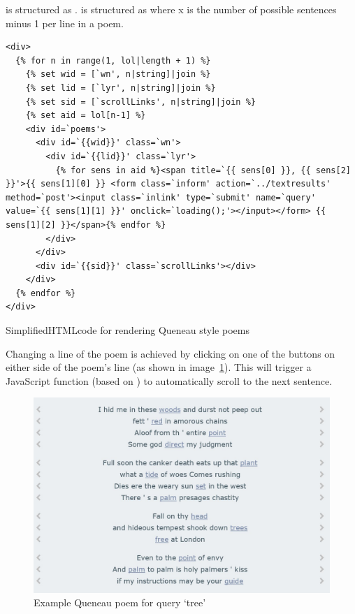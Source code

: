  is structured as .  is structured as  where x is the number of possible sentences minus 1 per line in a poem.


\begin{listing}[!htbp] %
  \begin{verbatim}
<div>
  {% for n in range(1, lol|length + 1) %}
    {% set wid = [`wn', n|string]|join %}
    {% set lid = [`lyr', n|string]|join %}
    {% set sid = [`scrollLinks', n|string]|join %}
    {% set aid = lol[n-1] %}
    <div id=`poems'>
      <div id=`{{wid}}' class=`wn'>
        <div id=`{{lid}}' class=`lyr'>
          {% for sens in aid %}<span title=`{{ sens[0] }}, {{ sens[2] }}'>{{ sens[1][0] }} <form class=`inform' action=`../textresults' method=`post'><input class=`inlink' type=`submit' name=`query' value=`{{ sens[1][1] }}' onclick=`loading();'></input></form> {{ sens[1][2] }}</span>{% endfor %}
        </div>
      </div>
      <div id=`{{sid}}' class=`scrollLinks'></div>
    </div>
  {% endfor %}
</div>
  \end{verbatim}
\caption[HTML for Queneau style poems]{Simplified\ac{HTML}code for rendering Queneau style poems}
\label{code:qpoems}
\end{listing}

Changing a line of the poem is achieved by clicking on one of the buttons on either side of the poem's line (as shown in image~\ref{img:qpoemtree}). This will trigger a JavaScript function (based on \autocite{DYNWEB2016}) to automatically scroll to the next sentence. 

\begin{figure}[!htbp] %
  \centering
  \includegraphics[width=\linewidth]{images/qpoemtree}
\caption[Queneau poem for query `tree']{Example Queneau poem for query `tree'}
\label{img:qpoemtree}
\end{figure}

